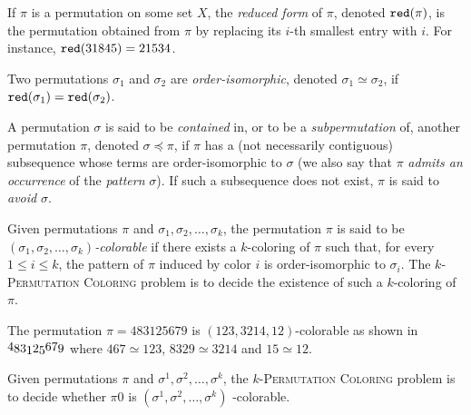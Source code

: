 \begin{definition}
    If $\pi$ is a permutation on some set $X$,
    the \emph{reduced form} of $\pi$, denoted $\operatorname{\texttt{red}}(\pi)$, is the permutation
    obtained from $\pi$ by replacing its $i$-th smallest entry
    with $i$.
    For instance, $\operatorname{\texttt{red}}(31845) = 21534$.
\end{definition}

\begin{definition}
    Two permutations $\sigma_1$ and $\sigma_2$ are \emph{order-isomorphic},
    denoted $\sigma_1 \simeq \sigma_2$,
    if $\operatorname{\texttt{red}}(\sigma_1) = \operatorname{\texttt{red}}(\sigma_2)$.
\end{definition}

\begin{definition}
    A permutation $\sigma$ is said to be \emph{contained} in, or to be
    a \emph{subpermutation} of, another permutation $\pi$, denoted
    $\sigma \preceq \pi$, if $\pi$ has a (not necessarily contiguous)
    subsequence whose terms are order-isomorphic to $\sigma$ (we also
    say that $\pi$ \emph{admits an occurrence} of the \emph{pattern}
    $\sigma$).
    If such a subsequence does not exist, $\pi$ is said to \emph{avoid}
    $\sigma$.
\end{definition}

\begin{definition}
  Given permutations $\pi$ and $\sigma_1, \sigma_2, \dots, \sigma_k$,
  the permutation $\pi$ is said to be
  \emph{$(\sigma_1, \sigma_2, \ldots, \sigma_k)$-colorable}
  if there exists a
  $k$-coloring of $\pi$ such that, for every $1 \leq i \leq k$, the
  pattern of $\pi$ induced by color $i$ is order-isomorphic to $\sigma_i$.
  The \textsc{$k$-Permutation Coloring} problem is to decide the existence of
  such a $k$-coloring of $\pi$.
\end{definition}

\begin{example}
The permutation $\pi = 483125679$ is $(123, 3214, 12)$-colorable
as shown in
$
\raisebox{1.5pt}{$4$}
\raisebox{0pt}{$8$}
\raisebox{0pt}{$3$}
\raisebox{-1.5pt}{$1$}
\raisebox{0pt}{$2$}
\raisebox{-1.5pt}{$5$}
\raisebox{1.5pt}{$6$}
\raisebox{1.5pt}{$7$}
\raisebox{0pt}{$9$}
$
where
$467 \simeq 123$,
$8329 \simeq 3214$ and
$15 \simeq 12$.
\end{example}

Given permutations $\pi$ and $\sigma^1, \sigma^2, \ldots, \sigma^k$,
the \textsc{$k$-Permutation Coloring} problem is to decide whether $\pi0$
is $(\sigma^1, \sigma^2, \ldots, \sigma^k)$ -colorable.

